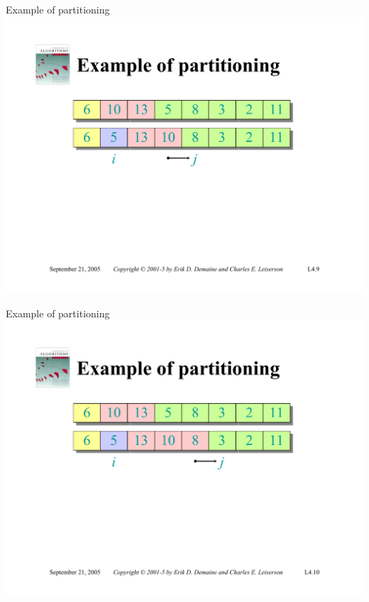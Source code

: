 \documentclass{beamer}
\begin{document}
\begin{frame}{Example of partitioning}
    \centering
    \includegraphics[width=\textwidth, trim={2.75cm 1.80cm 2.75cm 5.00cm}, clip]{pages/lec4_9}
\end{frame}
\begin{frame}{Example of partitioning}
    \centering
    \includegraphics[width=\textwidth, trim={2.75cm 1.80cm 2.75cm 5.00cm}, clip]{pages/lec4_10}
\end{frame}
\end{document}

